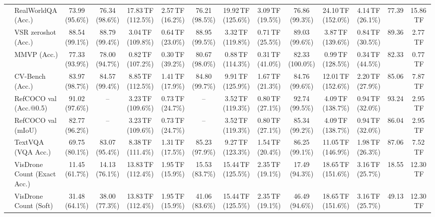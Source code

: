 \begin{table}[t]
\begin{center}
\begin{small}
\begin{sc}
{\begin{tabular}{llcccccccccccc}
& RealWorldQA (Acc.) & 73.99 (95.6\%) & \cellcolor{gray!15}76.34 (98.6\%) & 17.83\,TF (112.5\%) & 2.57\,TF (16.2\%) & \cellcolor{gray!15}76.21 (98.5\%) & 19.92\,TF (125.6\%) & 3.09\,TF (19.5\%) & \cellcolor{gray!15}76.86 (99.3\%) & 24.10\,TF (152.0\%) & 4.14\,TF (26.1\%) & 77.39 & 15.86\,TF \\
& VSR zeroshot (Acc.) & 88.54 (99.1\%) & \cellcolor{gray!15}88.79 (99.4\%) & 3.04\,TF (109.8\%) & 0.64\,TF (23.0\%) & \cellcolor{gray!15}88.95 (99.5\%) & 3.32\,TF (119.8\%) & 0.71\,TF (25.5\%) & \cellcolor{gray!15}89.03 (99.6\%) & 3.87\,TF (139.6\%) & 0.84\,TF (30.5\%) & 89.36 & 2.77\,TF \\
& MMVP (Acc.) & 77.33 (93.9\%) & 78.00 (94.7\%) & 0.82\,TF (107.2\%) & 0.30\,TF (39.2\%) & 80.67 (98.0\%) & 0.88\,TF (114.3\%) & 0.31\,TF (41.0\%) & \cellcolor{gray!15}82.33 (100.0\%) & 0.99\,TF (128.5\%) & 0.34\,TF (44.5\%) & 82.33 & 0.77\,TF \\
& CV-Bench (Acc.) & 83.97 (98.7\%) & \cellcolor{gray!15}84.57 (99.4\%) & 8.85\,TF (112.5\%) & 1.41\,TF (17.9\%) & \cellcolor{gray!15}84.80 (99.7\%) & 9.91\,TF (125.9\%) & 1.67\,TF (21.3\%) & \cellcolor{gray!15}84.76 (99.6\%) & 12.01\,TF (152.6\%) & 2.20\,TF (27.9\%) & 85.06 & 7.87\,TF \\
& RefCOCO val (Acc.@0.5) & 91.02 (97.6\%) & -- & 3.23\,TF (109.6\%) & 0.73\,TF (24.7\%) & -- & 3.52\,TF (119.3\%) & 0.80\,TF (27.1\%) & \cellcolor{gray!15}92.74 (99.5\%) & 4.09\,TF (138.7\%) & 0.94\,TF (32.0\%) & 93.24 & 2.95\,TF \\
& RefCOCO val (mIoU) & 82.77 (96.2\%) & -- & 3.23\,TF (109.6\%) & 0.73\,TF (24.7\%) & -- & 3.52\,TF (119.3\%) & 0.80\,TF (27.1\%) & \cellcolor{gray!15}85.34 (99.2\%) & 4.09\,TF (138.7\%) & 0.94\,TF (32.0\%) & 86.04 & 2.95\,TF \\
& TextVQA (VQA Acc.) & 69.75 (80.1\%) & 83.07 (95.4\%) & 8.38\,TF (111.4\%) & 1.31\,TF (17.5\%) & 85.23 (97.9\%) & 9.27\,TF (123.3\%) & 1.54\,TF (20.4\%) & \cellcolor{gray!15}86.25 (99.1\%) & 11.05\,TF (146.9\%) & 1.98\,TF (26.3\%) & 87.06 & 7.52\,TF \\
& VisDrone Count (Exact Acc.) & 11.45 (61.7\%) & 14.13 (76.1\%) & 13.83\,TF (112.4\%) & 1.95\,TF (15.9\%) & 15.53 (83.7\%) & 15.44\,TF (125.5\%) & 2.35\,TF (19.1\%) & 17.49 (94.3\%) & 18.65\,TF (151.6\%) & 3.16\,TF (25.7\%) & 18.55 & 12.30\,TF \\
& VisDrone Count (Soft) & 31.48 (64.1\%) & 38.00 (77.3\%) & 13.83\,TF (112.4\%) & 1.95\,TF (15.9\%) & 41.06 (83.6\%) & 15.44\,TF (125.5\%) & 2.35\,TF (19.1\%) & 46.49 (94.6\%) & 18.65\,TF (151.6\%) & 3.16\,TF (25.7\%) & 49.13 & 12.30\,TF \\

\end{tabular}}
\end{sc}
\end{small}
\end{center}
\end{table}
